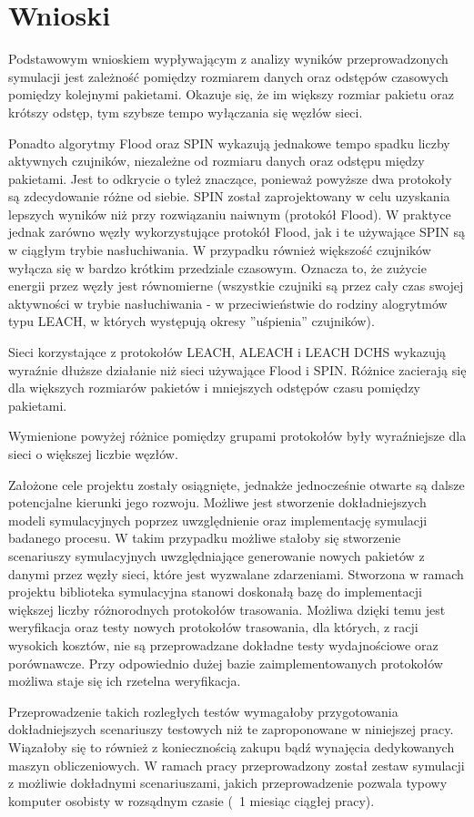 \chapter{Wnioski}

Podstawowym wnioskiem wypływającym z analizy wyników przeprowadzonych symulacji jest zależność pomiędzy rozmiarem danych oraz odstępów czasowych pomiędzy kolejnymi pakietami. Okazuje się, że im większy rozmiar pakietu oraz krótszy odstęp, tym  szybsze tempo wyłączania się węzłów sieci.

Ponadto algorytmy Flood oraz SPIN wykazują jednakowe tempo spadku liczby aktywnych czujników, niezależne od rozmiaru danych oraz odstępu między pakietami. Jest to odkrycie o tyleż znaczące, ponieważ powyższe dwa protokoły są zdecydowanie różne od siebie. SPIN został zaprojektowany w celu uzyskania lepszych wyników niż przy rozwiązaniu naiwnym (protokół Flood). W praktyce jednak zarówno węzły wykorzystujące protokół Flood, jak i te używające SPIN są w ciągłym trybie nasłuchiwania.   W przypadku również większość czujników wyłącza się w bardzo krótkim przedziale czasowym. Oznacza to, że zużycie energii przez węzły jest równomierne (wszystkie czujniki są przez cały czas swojej aktywności w trybie nasłuchiwania - w przeciwieństwie do rodziny alogrytmów typu LEACH, w których występują okresy ''uśpienia'' czujników).

Sieci korzystające z protokołów LEACH, ALEACH i LEACH DCHS wykazują wyraźnie dłuższe działanie niż sieci używające Flood i SPIN.
Różnice zacierają się dla większych rozmiarów pakietów i mniejszych odstępów czasu pomiędzy pakietami.

Wymienione powyżej różnice pomiędzy grupami protokołów były wyraźniejsze dla sieci o większej liczbie węzłów.


Założone cele projektu zostały osiągnięte, jednakże jednocześnie otwarte są dalsze potencjalne kierunki jego rozwoju. Możliwe jest stworzenie dokładniejszych modeli symulacyjnych poprzez uwzględnienie oraz implementację symulacji badanego procesu. W takim przypadku możliwe stałoby się stworzenie scenariuszy symulacyjnych uwzględniające generowanie nowych pakietów z danymi przez węzły sieci, które jest wyzwalane zdarzeniami.
Stworzona w ramach projektu biblioteka symulacyjna stanowi doskonałą bazę do implementacji większej liczby różnorodnych protokołów trasowania. Możliwa dzięki temu jest weryfikacja oraz testy nowych protokołów trasowania, dla których, z racji wysokich kosztów, nie są przeprowadzane dokładne testy wydajnościowe oraz porównawcze. Przy odpowiednio dużej bazie zaimplementowanych protokołów możliwa staje się ich rzetelna weryfikacja.

Przeprowadzenie takich rozległych testów wymagałoby przygotowania dokładniejszych scenariuszy testowych niż te zaproponowane w niniejszej pracy. Wiązałoby się to również z koniecznością zakupu bądź wynajęcia dedykowanych maszyn obliczeniowych. W ramach pracy przeprowadzony został zestaw symulacji z możliwie dokładnymi scenariuszami, jakich przeprowadzenie pozwala typowy komputer osobisty w rozsądnym czasie (~1 miesiąc ciągłej pracy).

